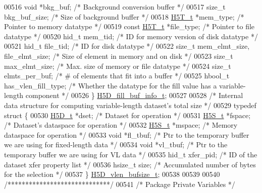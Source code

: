 \begin{DoxyCode}
00516     \textcolor{keywordtype}{void}       *bkg\_buf;                \textcolor{comment}{/* Background conversion buffer */}
00517     \textcolor{keywordtype}{size\_t}      bkg\_buf\_size;           \textcolor{comment}{/* Size of background buffer */}
00518     \hyperlink{struct_h5_t__t}{H5T\_t}      *mem\_type;               \textcolor{comment}{/* Pointer to memory datatype */}
00519     \textcolor{keyword}{const} \hyperlink{struct_h5_t__t}{H5T\_t} *file\_type;             \textcolor{comment}{/* Pointer to file datatype */}
00520     hid\_t       mem\_tid;                \textcolor{comment}{/* ID for memory version of disk datatype */}
00521     hid\_t       file\_tid;               \textcolor{comment}{/* ID for disk datatype */}
00522     \textcolor{keywordtype}{size\_t}      mem\_elmt\_size, file\_elmt\_size;       \textcolor{comment}{/* Size of element in memory and on disk */}
00523     \textcolor{keywordtype}{size\_t}      max\_elmt\_size;          \textcolor{comment}{/* Max. size of memory or file datatype */}
00524     \textcolor{keywordtype}{size\_t}      elmts\_per\_buf;          \textcolor{comment}{/* # of elements that fit into a buffer */}
00525     hbool\_t     has\_vlen\_fill\_type;     \textcolor{comment}{/* Whether the datatype for the fill value has a variable-length
       component */}
00526 \} \hyperlink{struct_h5_d__fill__buf__info__t}{H5D\_fill\_buf\_info\_t};
00527 
00528 \textcolor{comment}{/* Internal data structure for computing variable-length dataset's total size */}
00529 \textcolor{keyword}{typedef} \textcolor{keyword}{struct }\{
00530     \hyperlink{struct_h5_d__t}{H5D\_t} *dset;        \textcolor{comment}{/* Dataset for operation */}
00531     \hyperlink{struct_h5_s__t}{H5S\_t} *fspace;      \textcolor{comment}{/* Dataset's dataspace for operation */}
00532     \hyperlink{struct_h5_s__t}{H5S\_t} *mspace;      \textcolor{comment}{/* Memory dataspace for operation */}
00533     \textcolor{keywordtype}{void} *fl\_tbuf;      \textcolor{comment}{/* Ptr to the temporary buffer we are using for fixed-length data */}
00534     \textcolor{keywordtype}{void} *vl\_tbuf;      \textcolor{comment}{/* Ptr to the temporary buffer we are using for VL data */}
00535     hid\_t xfer\_pid;     \textcolor{comment}{/* ID of the dataset xfer property list */}
00536     hsize\_t size;       \textcolor{comment}{/* Accumulated number of bytes for the selection */}
00537 \} \hyperlink{struct_h5_d__vlen__bufsize__t}{H5D\_vlen\_bufsize\_t};
00538 
00539 
00540 \textcolor{comment}{/*****************************/}
00541 \textcolor{comment}{/* Package Private Variables */}

\end{DoxyCode}
